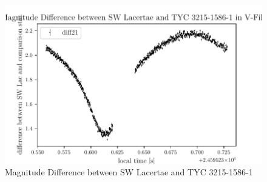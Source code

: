   \begin{figure}[H]
    \centering
    \includegraphics{V-Filter.pdf}
    \caption{Magnitude Difference between SW Lacertae and TYC 3215-1586-1}
    \label{fig:plot}
  \end{figure}

